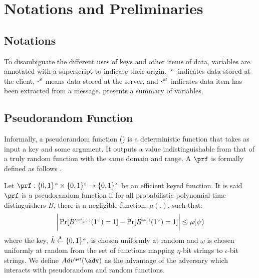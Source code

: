 




\vspace{-4mm}

\section{Notations and Preliminaries}

 \vspace{-2mm}
 \subsection{Notations}
  \vspace{-1mm}
  
 To disambiguate the different uses of keys and other items of data, variables are annotated with a superscript to indicate their origin. $\cdot^{\scriptscriptstyle C}$ indicates data stored at the client, $\cdot^{\scriptscriptstyle S}$ means data stored at the server, and $\cdot^{\scriptscriptstyle M}$ indicates data item has been extracted from a message.  presents  a summary of variables.
 
 \vspace{-5mm}
 


 \vspace{-6mm}
\subsection{Pseudorandom Function}\label{subsec:PRF}
  \vspace{-1mm}
Informally, a pseudorandom function (\prf) is a deterministic function that takes as input a key and some argument. It outputs a value  indistinguishable from that of a truly random function with the same domain and range.   A $\prf$ is formally defined as follows \cite{KatzLindell2014}. 
  \vspace{-2mm}
\begin{definition} Let $\prf:\{0,1\}^{\sss\psi}\times \{0,1\}^{\sss \eta}\rightarrow \{0,1\}^{\sss  \lambda}$ be an efficient  keyed function. It is said $\prf$ is a pseudorandom function if for all probabilistic polynomial-time distinguishers $B$, there is a negligible function, $\mu(.)$, such that:
%
 \vspace{-1mm}
\begin{equation*}
\bigg | \Pr[B^{\sss \prf_{\hat{k}}(.)}(1^{\sss \psi})=1]- \Pr[B^{\sss \omega(.)}(1^{\sss \psi})=1] \bigg |\leq\mu(\psi)
\end{equation*}
%
where  the key, $\hat{k}\stackrel{\scriptscriptstyle\$}\leftarrow\{0,1\}^{\scriptscriptstyle\psi}$, is chosen uniformly at random and $\omega$ is chosen uniformly at random from the set of functions mapping $\eta$-bit strings to $\iota$-bit strings. We define $Adv^{\sss\prf}(\adv)$ as the advantage of the adversary which interacts with pseudorandom and random functions. 

\end{definition}

